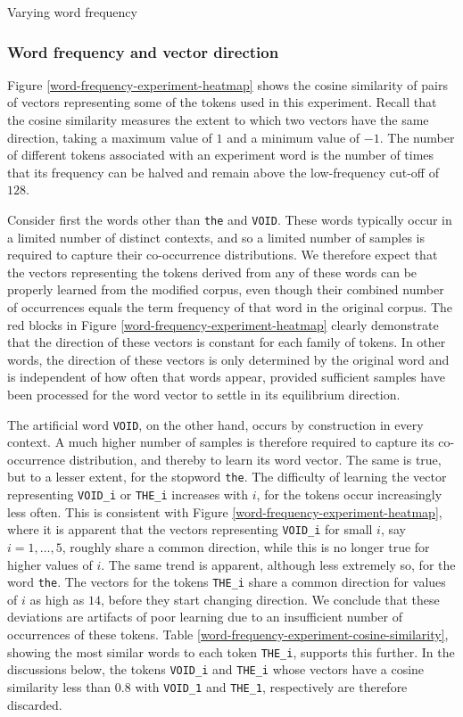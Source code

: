 \documentclass{article} %
\newcommand{\word}[1]{\texttt{#1}}
\begin{document}
\begin{section}{Varying word frequency}
\subsubsection{Word frequency and vector direction}\label{WFVE-direction}
Figure \ref{word-frequency-experiment-heatmap} shows the cosine
similarity of pairs of vectors representing some of the tokens used in
this experiment.  Recall that the cosine similarity measures the extent
to which two vectors have the same direction, taking a maximum value of
$1$ and a minimum value of $-1$.  The number of different tokens
associated with an experiment word is the number of times that its
frequency can be halved and remain above the low-frequency cut-off of
$128$.

Consider first the words other than \word{the} and \word{VOID}.  These
words typically occur in a limited number of distinct contexts, and
so a limited number of samples is required to capture their
co-occurrence distributions.  We therefore expect that the vectors
representing the tokens derived from any of these words can be properly
learned from the modified corpus, even though their combined number of
occurrences equals the term frequency of that word in the original
corpus.  The red blocks in Figure \ref{word-frequency-experiment-heatmap}
clearly demonstrate that the direction of these vectors is constant for
each family of tokens.  In other words, the direction of these vectors
is only determined by the original word and is independent of how often
that words appear, provided sufficient samples have been processed for
the word vector to settle in its equilibrium direction.

The artificial word \word{VOID}, on the other hand, occurs by
construction in every context.  A much higher number of samples is
therefore required to capture its co-occurrence distribution, and
thereby to learn its word vector.  The same is true, but to a lesser
extent, for the stopword \word{the}.  The difficulty of learning the
vector representing \word{VOID\_i} or \word{THE\_i} increases with $i$,
for the tokens occur increasingly less often.  This is consistent with
Figure \ref{word-frequency-experiment-heatmap}, where it is apparent that
the vectors representing \word{VOID\_i} for small $i$, say $i = 1,
\dots, 5$, roughly share a common direction, while this is no longer
true for higher values of $i$.  The same trend is apparent, although
less extremely so, for the word \word{the}.  The vectors for the tokens
\word{THE\_i} share a common direction for values of $i$ as high as
$14$, before they start changing direction.  We conclude that these
deviations are artifacts of poor learning due to an insufficient number
of occurrences of these tokens.
Table \ref{word-frequency-experiment-cosine-similarity}, showing the
most similar words to each token \word{THE\_i}, supports this further.  In the
discussions below, the tokens \word{VOID\_i} and
\word{THE\_i} whose vectors have a cosine similarity less than $0.8$
with \word{VOID\_1} and \word{THE\_1}, respectively are therefore
discarded.


\end{section}
\end{document}
